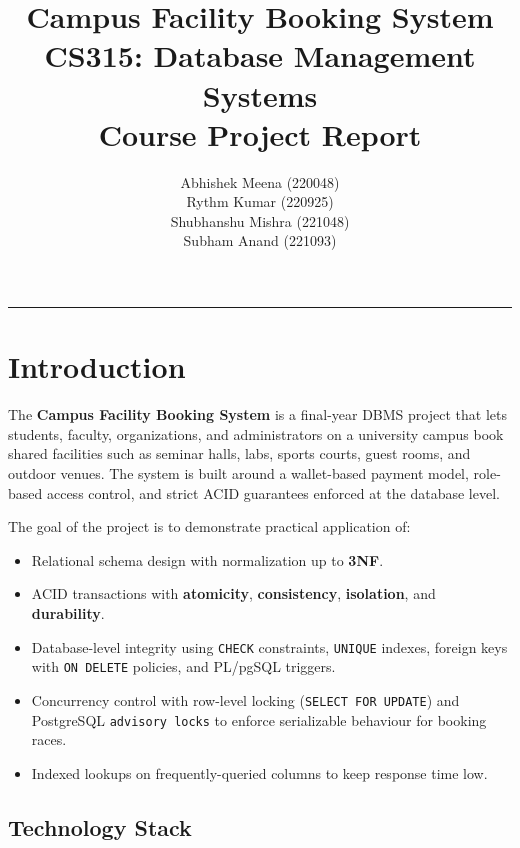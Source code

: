 \documentclass[11pt,a4paper]{article}
\title{
    \vspace{-1cm}
    \textbf{\Huge Campus Facility Booking System}\\[0.3cm]
    \Large CS315: Database Management Systems \\[0.1cm]
    \large Course Project Report
}
\author{
    Abhishek Meena (220048) \\
    Rythm Kumar (220925) \\
    Shubhanshu Mishra (221048) \\
    Subham Anand (221093)
}
\date{}
\begin{document}
\maketitle
\thispagestyle{empty}

\vspace{0.5cm}
\begin{center}
\rule{0.6\textwidth}{0.5pt}
\end{center}

\tableofcontents
\thispagestyle{empty}
\newpage
\setcounter{page}{1}

\section{Introduction}

The \textbf{Campus Facility Booking System} is a final-year DBMS project that lets students, faculty, organizations, and administrators on a university campus book shared facilities such as seminar halls, labs, sports courts, guest rooms, and outdoor venues. The system is built around a wallet-based payment model, role-based access control, and strict ACID guarantees enforced at the database level.

The goal of the project is to demonstrate practical application of:
\begin{itemize}[leftmargin=*]
    \item Relational schema design with normalization up to \textbf{3NF}.
    \item ACID transactions with \textbf{atomicity}, \textbf{consistency}, \textbf{isolation}, and \textbf{durability}.
    \item Database-level integrity using \texttt{CHECK} constraints, \texttt{UNIQUE} indexes, foreign keys with \texttt{ON DELETE} policies, and PL/pgSQL triggers.
    \item Concurrency control with row-level locking (\texttt{SELECT FOR UPDATE}) and PostgreSQL \texttt{advisory locks} to enforce serializable behaviour for booking races.
    \item Indexed lookups on frequently-queried columns to keep response time low.
\end{itemize}

\subsection{Technology Stack}
\end{document}
